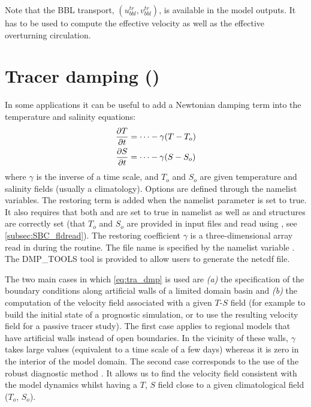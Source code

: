 \documentclass[../main/NEMO_manual]{subfiles}
\begin{document}
Note that the BBL transport, $(u^{tr}_{bbl},v^{tr}_{bbl})$, is available in the model outputs.
It has to be used to compute the effective velocity as well as the effective overturning circulation.

\section{Tracer damping (\protect{})}
\label{sec:TRA_dmp}


In some applications it can be useful to add a Newtonian damping term into the temperature and salinity equations:
\begin{equation}
  \label{eq:tra_dmp}
  \begin{gathered}
    \pd[T]{t} = \cdots - \gamma (T - T_o) \\
    \pd[S]{t} = \cdots - \gamma (S - S_o)
  \end{gathered}
\end{equation} 
where $\gamma$ is the inverse of a time scale, and $T_o$ and $S_o$ are given temperature and salinity fields
(usually a climatology).
Options are defined through the   namelist variables.
The restoring term is added when the namelist parameter  is set to true.
It also requires that both  and  are set to true in
 namelist as well as  and  structures are correctly set
(\ie that $T_o$ and $S_o$ are provided in input files and read using ,
see \autoref{subsec:SBC_fldread}).
The restoring coefficient $\gamma$ is a three-dimensional array read in during the  routine.
The file name is specified by the namelist variable .
The DMP\_TOOLS tool is provided to allow users to generate the netcdf file.

The two main cases in which \autoref{eq:tra_dmp} is used are
\textit{(a)} the specification of the boundary conditions along artificial walls of a limited domain basin and
\textit{(b)} the computation of the velocity field associated with a given $T$-$S$ field
(for example to build the initial state of a prognostic simulation,
or to use the resulting velocity field for a passive tracer study).
The first case applies to regional models that have artificial walls instead of open boundaries.
In the vicinity of these walls, $\gamma$ takes large values (equivalent to a time scale of a few days) whereas
it is zero in the interior of the model domain.
The second case corresponds to the use of the robust diagnostic method \citep{Sarmiento1982}.
It allows us to find the velocity field consistent with the model dynamics whilst
having a $T$, $S$ field close to a given climatological field ($T_o$, $S_o$).
\end{document}
